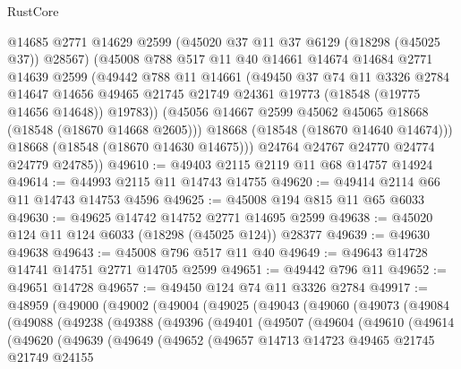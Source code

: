 \begin{lexlean}{RustCore}
\begin{coremodule}
          @14685
          @2771
          @14629
          @2599
          (@45020 @37 @11 @37 @6129 (@18298 (@45025 @37)) @28567)
          (@45008
            @788
            @517
            @11
            @40
            @14661
            @14674
            @14684
            @2771
            @14639
            @2599
            (@49442
              @788
              @11
              @14661
              (@49450
                @37
                @74
                @11
                @3326
                @2784
                @14647
                @14656
                @49465
                @21745
                @21749
                @24361
                @19773
                (@18548 (@19775 @14656 @14648))
                @19783))
            (@45056 @14667 @2599 @45062 @45065 @18668 (@18548 (@18670 @14668 @2605)))
            @18668
            (@18548 (@18670 @14640 @14674)))
          @18668
          (@18548 (@18670 @14630 @14675)))
        @24764
        @24767
        @24770
        @24774
        @24779
        @24785))
@49610 := @49403 @2115 @2119 @11 @68 @14757 @14924
@49614 := @44993 @2115 @11 @14743 @14755
@49620 := @49414 @2114 @66 @11 @14743 @14753 @4596
@49625 := @45008 @194 @815 @11 @65 @6033
@49630 := @49625 @14742 @14752 @2771 @14695 @2599
@49638 := @45020 @124 @11 @124 @6033 (@18298 (@45025 @124)) @28377
@49639 := @49630 @49638
@49643 := @45008 @796 @517 @11 @40
@49649 := @49643 @14728 @14741 @14751 @2771 @14705 @2599
@49651 := @49442 @796 @11
@49652 := @49651 @14728
@49657 := @49450 @124 @74 @11 @3326 @2784
@49917 := @48959
    (@49000
      (@49002
        (@49004
          (@49025
            (@49043
              (@49060
                (@49073
                  (@49084
                    (@49088
                      (@49238
                        (@49388
                          (@49396
                            (@49401
                              (@49507
                                (@49604
                                  (@49610
                                    (@49614
                                      (@49620
                                        (@49639
                                          (@49649
                                            (@49652
                                              (@49657
                                                @14713
                                                @14723
                                                @49465
                                                @21745
                                                @21749
                                                @24155

\end{coremodule}
\end{lexlean}
